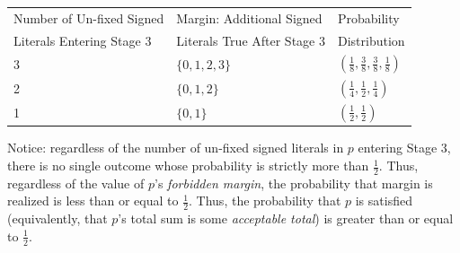 \documentclass{article}
\begin{document}
\renewcommand\arraystretch{1.3} 

\begin{tabular}{|l|l|l|} \hline
Number of Un-fixed Signed  & Margin: Additional Signed  & Probability  \\
Literals Entering Stage 3 & Literals True After Stage 3& Distribution  \\
\hline
3 & $\{0,1,2,3\}$& $(\frac{1}{8},\frac{3}{8},\frac{3}{8},\frac{1}{8})$\\ 
\hline
2 & $\{0,1,2\}$& $(\frac{1}{4},\frac{1}{2},\frac{1}{4})$\\ 
\hline
1 & $\{0,1\}$& $(\frac{1}{2},\frac{1}{2})$\\ 
\hline
\end{tabular}

\vspace{4mm}

Notice: regardless of the number of un-fixed signed literals in $p$ entering Stage 3, there is no single outcome whose probability is strictly more than $\frac{1}{2}$.  Thus, regardless of the value of $p$'s \textit{forbidden margin}, the probability that margin is realized is less than or equal to $\frac{1}{2}$. Thus, the probability that $p$ is satisfied (equivalently, that $p$'s total sum is some \textit{acceptable total}) is greater than or equal to $\frac{1}{2}$. 
\end{document}
